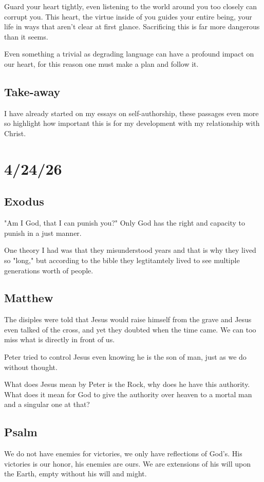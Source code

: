 Guard your heart tightly, even listening to the world around you too closely can corrupt you. This heart, the virtue inside of you guides your entire being, your life in ways that aren't clear at first glance. Sacrificing this is far more dangerous than it seems.

Even something a trivial as degrading language can have a profound impact on our heart, for this reason one must make a plan and follow it.

\subsection{Take-away}
I have already started on my essays on self-authorship, these passages even more so highlight how important this is for my development with my relationship with Christ.

\section{4/24/26}
\subsection{Exodus}
"Am I God, that I can punish you?" Only God has the right and capacity to punish in a just manner.

One theory I had was that they misunderstood years and that is why they lived so "long," but according to the bible they legtitamtely lived to see multiple generations worth of people.

\subsection{Matthew}
The disiples were told that Jesus would raise himself from the grave and Jesus even talked of the cross, and yet they doubted when the time came. We can too miss what is directly in front of us.

Peter tried to control Jesus even knowing he is the son of man, just as we do without thought.

What does Jesus mean by Peter is the Rock, why does he have this authority. What does it mean for God to give the authority over heaven to a mortal man and a singular one at that?

\subsection{Psalm}
We do not have enemies for victories, we only have reflections of God's. His victories is our honor, his enemies are ours. We are extensions of his will upon the Earth, empty without his will and might.

